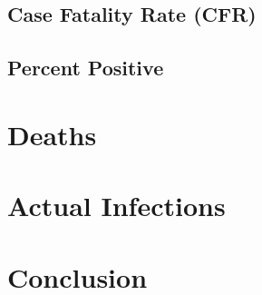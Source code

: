 \documentclass[
]{book}
\begin{document}
\hypertarget{case-fatality-rate-cfr}{%
\section{Case Fatality Rate (CFR)}\label{case-fatality-rate-cfr}}

\hypertarget{percent-positive}{%
\section{Percent Positive}\label{percent-positive}}

\hypertarget{deaths}{%
\chapter{Deaths}\label{deaths}}

\hypertarget{actual-infections}{%
\chapter{Actual Infections}\label{actual-infections}}

\hypertarget{conclusion}{%
\chapter{Conclusion}\label{conclusion}}

  
\end{document}
